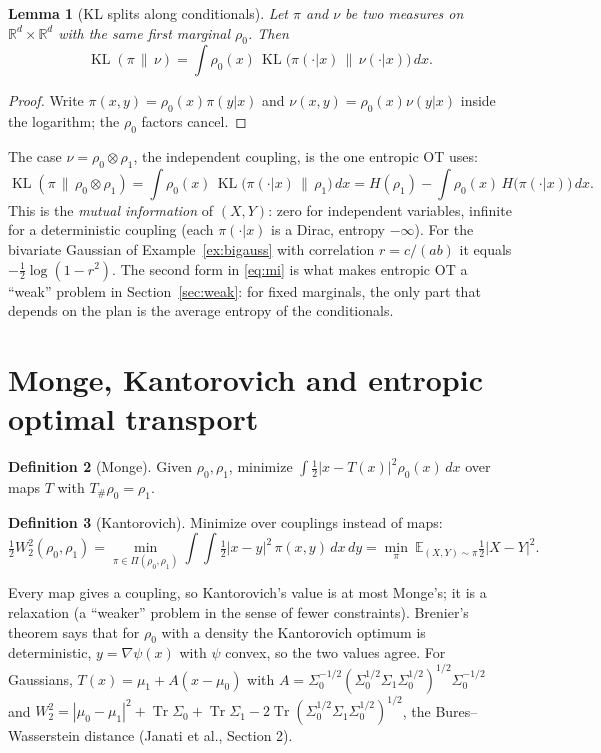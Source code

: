 \documentclass[11pt]{article}
\newcommand{\R}{\mathbb{R}}
\newcommand{\E}{\mathbb{E}}
\newcommand{\tr}{\operatorname{Tr}}
\newcommand{\KL}{\operatorname{KL}}
\theoremstyle{definition}
\newtheorem{definition}{Definition}[section]
\theoremstyle{plain}
\newtheorem{lemma}[definition]{Lemma}
\begin{document}
\begin{lemma}[KL splits along conditionals]
\label{lem:chain}
Let $\pi$ and $\nu$ be two measures on $\R^d\times\R^d$ with the same first marginal
$\rho_0$. Then
\[
  \KL(\pi\,\|\,\nu)=\int\rho_0(x)\,\KL\big(\pi(\cdot|x)\,\big\|\,\nu(\cdot|x)\big)\,dx .
\]
\end{lemma}
\begin{proof}
Write $\pi(x,y)=\rho_0(x)\pi(y|x)$ and $\nu(x,y)=\rho_0(x)\nu(y|x)$ inside the logarithm;
the $\rho_0$ factors cancel.
\end{proof}

The case $\nu=\rho_0\otimes\rho_1$, the independent coupling, is the one entropic OT uses:
\begin{equation}
  \label{eq:mi}
  \KL(\pi\,\|\,\rho_0\otimes\rho_1)=\int\rho_0(x)\,\KL\big(\pi(\cdot|x)\,\|\,\rho_1\big)\,dx
  = H(\rho_1)-\int\rho_0(x)\,H\big(\pi(\cdot|x)\big)\,dx .
\end{equation}
This is the \emph{mutual information} of $(X,Y)$: zero for independent variables, infinite
for a deterministic coupling (each $\pi(\cdot|x)$ is a Dirac, entropy $-\infty$). For the
bivariate Gaussian of Example~\ref{ex:bigauss} with correlation $r=c/(ab)$ it equals
$-\tfrac12\log(1-r^2)$. The second form in \eqref{eq:mi} is what makes entropic OT a
``weak'' problem in Section~\ref{sec:weak}: for fixed marginals, the only part that depends
on the plan is the average entropy of the conditionals.

\section{Monge, Kantorovich and entropic optimal transport}
\label{sec:ot}

\begin{definition}[Monge]
Given $\rho_0,\rho_1$, minimize $\int\tfrac12|x-T(x)|^2\rho_0(x)\,dx$ over maps $T$ with $T_\#\rho_0=\rho_1$.
\end{definition}

\begin{definition}[Kantorovich]
Minimize over couplings instead of maps:
\[
  \tfrac12 W_2^2(\rho_0,\rho_1)=\min_{\pi\in\Pi(\rho_0,\rho_1)}\int\!\!\int\tfrac12|x-y|^2\,\pi(x,y)\,dx\,dy
  =\min_{\pi}\ \E_{(X,Y)\sim\pi}\tfrac12|X-Y|^2 .
\]
\end{definition}
Every map gives a coupling, so Kantorovich's value is at most Monge's; it is a relaxation
(a ``weaker'' problem in the sense of fewer constraints). Brenier's theorem says that for
$\rho_0$ with a density the Kantorovich optimum is deterministic, $y=\nabla\psi(x)$ with
$\psi$ convex, so the two values agree. For Gaussians, $T(x)=\mu_1+A(x-\mu_0)$ with
$A=\Sigma_0^{-1/2}(\Sigma_0^{1/2}\Sigma_1\Sigma_0^{1/2})^{1/2}\Sigma_0^{-1/2}$ and
$W_2^2=|\mu_0-\mu_1|^2+\tr\Sigma_0+\tr\Sigma_1-2\tr(\Sigma_0^{1/2}\Sigma_1\Sigma_0^{1/2})^{1/2}$,
the Bures--Wasserstein distance (Janati et al., Section 2).
\end{document}
